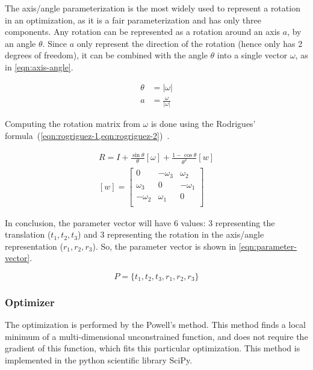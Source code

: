 The axis/angle parameterization is the most widely used to represent a rotation in an optimization, as it is a fair parameterization and has only three components. Any rotation can be represented as a rotation around an axis $a$, by an angle $\theta$. Since $a$ only represent the direction of the rotation (hence only has 2 degrees of freedom), it can be combined with the angle $\theta$ into a single vector $\omega$, as in \cref{eqn:axis-angle}.

\begin{equation}
    \label{eqn:axis-angle}
    \begin{aligned}
        \theta & = |\omega| \\
        a & = \frac{\omega}{|\omega|}
    \end{aligned}
\end{equation}

Computing the rotation matrix from $\omega$ is done using the Rodrigues' formula~(\cref{eqn:rogriguez-1,eqn:rogriguez-2})~\cite{schmidt01}.

\begin{align}
    \label{eqn:rogriguez-1}
    R = I + \frac{\sin \theta}{\theta} [\omega] + \frac{1 - \cos \theta}{\theta^2} [w] \\
    \label{eqn:rogriguez-2}
    [w] = \left[
        \begin{array}{ccc}
            0  & -\omega_3 & \omega_2 \\
            \omega_3 & 0   & -\omega_1 \\
            -\omega_2 & \omega_1 & 0 \\
        \end{array}
    \right]
\end{align}

In conclusion, the parameter vector will have 6 values: 3 representing the translation ($t_1, t_2, t_3$) and 3 representing the rotation in the axis/angle representation ($r_1, r_2, r_3$). So, the parameter vector is shown in \cref{eqn:parameter-vector}.

\begin{equation}
    \label{eqn:parameter-vector}
    P = \{t_1, t_2, t_3, r_1, r_2, r_3\}
\end{equation}

\subsubsection{Optimizer}

The optimization is performed by the Powell's method. This method finds a local minimum of a multi-dimensional unconstrained function, and does not require the gradient of this function, which fits this particular optimization. This method is implemented in the python scientific library SciPy.

